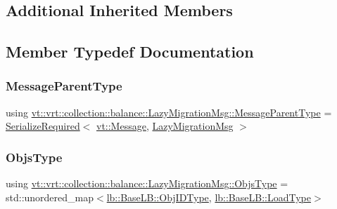 \subsection*{Additional Inherited Members}


\subsection{Member Typedef Documentation}
\mbox{\label{structvt_1_1vrt_1_1collection_1_1balance_1_1_lazy_migration_msg_ae85922f15b423b53083cccda06ef0b45}} 
\subsubsection{\texorpdfstring{Message\+Parent\+Type}{MessageParentType}}
{\footnotesize\ttfamily using \hyperlink{structvt_1_1vrt_1_1collection_1_1balance_1_1_lazy_migration_msg_ae85922f15b423b53083cccda06ef0b45}{vt\+::vrt\+::collection\+::balance\+::\+Lazy\+Migration\+Msg\+::\+Message\+Parent\+Type} =  \hyperlink{namespacevt_a9e60e2e8929828639383ac1d6643384d}{Serialize\+Required}$<$ \hyperlink{namespacevt_a3a3ddfef40b4c90915fa43cdd5f129ea}{vt\+::\+Message}, \hyperlink{structvt_1_1vrt_1_1collection_1_1balance_1_1_lazy_migration_msg}{Lazy\+Migration\+Msg} $>$}

\mbox{\label{structvt_1_1vrt_1_1collection_1_1balance_1_1_lazy_migration_msg_a8d71e0015ee1e05da54701cae56ef31c}} 
\subsubsection{\texorpdfstring{Objs\+Type}{ObjsType}}
{\footnotesize\ttfamily using \hyperlink{structvt_1_1vrt_1_1collection_1_1balance_1_1_lazy_migration_msg_a8d71e0015ee1e05da54701cae56ef31c}{vt\+::vrt\+::collection\+::balance\+::\+Lazy\+Migration\+Msg\+::\+Objs\+Type} =  std\+::unordered\+\_\+map$<$\hyperlink{structvt_1_1vrt_1_1collection_1_1lb_1_1_base_l_b_a15a2f756b59c8c2437985206b32aa403}{lb\+::\+Base\+L\+B\+::\+Obj\+I\+D\+Type}, \hyperlink{structvt_1_1vrt_1_1collection_1_1lb_1_1_base_l_b_a215e22b9f12678303f49615ae3be05cc}{lb\+::\+Base\+L\+B\+::\+Load\+Type}$>$}



